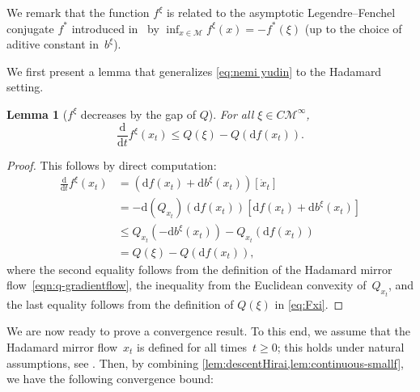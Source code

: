 \documentclass[11pt,letterpaper]{article}
\newtheorem{lemma}[theorem]{Lemma}\AddToHook{env/lemma/begin}{\crefalias{theorem}{lemma}}
\numberwithin{equation}{section}
\newcommand{\diff}{\mathrm{d}}
\newcommand{\MM}{\mathcal{M}}
\begin{document}
We remark that the function $f^\xi$ is related to the asymptotic Legendre--Fenchel conjugate $f^*$ introduced in~\cite[(2.16)]{Hirai2024} by $\inf_{x \in \MM} f^\xi(x) = -f^*(\xi)$ (up to the choice of aditive constant in~$b^\xi$).

We first present a lemma that generalizes \cref{eq:nemi yudin} to the Hadamard setting.

\begin{lemma}[$f^\xi$ decreases by the gap of $Q$]\label{lem:continuous-smallf}
    For all $\xi \in C\MM^\infty$,
    \[
        \frac{\diff}{\diff t} f^\xi(x_t) \leq Q(\xi) - Q(\diff f(x_t)).
    \]
\end{lemma}
\begin{proof}
This follows by direct computation:
    \begin{align*}
        \frac{\diff}{\diff t}f^\xi(x_t)
        &= \left(\diff f(x_t) + \diff b^\xi(x_t)\right)\left[\dot x_t\right]\\
        &= -\diff (Q_{x_t})(\diff f(x_t))\left[\diff f(x_t) + \diff b^\xi(x_t)\right]\\
        &\leq Q_{x_t}(-\diff b^\xi(x_t)) - Q_{x_t}(\diff f(x_t)) \\
        &= Q(\xi) - Q(\diff f(x_t)),
    \end{align*}
    where the second equality follows from the definition of the Hadamard mirror flow~\eqref{eqn:q-gradientflow}, the inequality from the Euclidean convexity of~$Q_{x_t}$, and the last equality follows from the definition of $Q(\xi)$ in \cref{eq:Fxi}.
\end{proof}

We are now ready to prove a convergence result.
To this end, we assume that the Hadamard mirror flow~$x_t$ is defined for all times~$t\geq0$; this holds under natural assumptions, see \cite[Lem.~3.11]{Hirai2025}.
Then, by combining \cref{lem:descentHirai,lem:continuous-smallf}, we have the following convergence bound:
\end{document}
